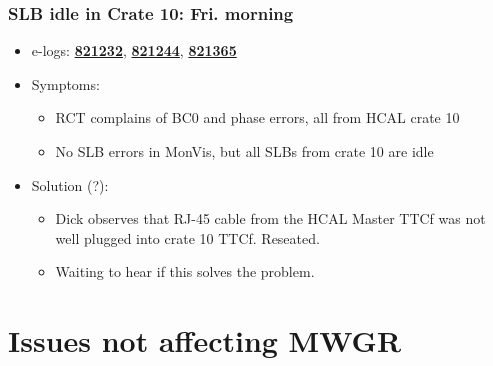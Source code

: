 \documentclass[bigger]{beamer}
\providecommand{\alert}[1]{\textbf{#1}}
\begin{document}
\begin{frame}
\frametitle{SLB idle in Crate 10: Fri. morning}
\label{sec-2-1-4}
\begin{itemize}

\item e-logs: \href{http://cmsonline.cern.ch/cms-elog/821232}{\alert{821232}}, \href{http://cmsonline.cern.ch/cms-elog/821244}{\alert{821244}}, \href{http://cmsonline.cern.ch/cms-elog/821365}{\alert{821365}}
\label{sec-2-1-4-1}%

\item Symptoms:
\label{sec-2-1-4-2}%
\begin{itemize}

\item RCT complains of BC0 and phase errors, all from HCAL crate 10
\label{sec-2-1-4-2-1}%

\item No SLB errors in MonVis, but all SLBs from crate 10 are idle
\label{sec-2-1-4-2-2}%
\end{itemize} %

\item Solution (?):
\label{sec-2-1-4-3}%
\begin{itemize}

\item Dick observes that RJ-45 cable from the HCAL Master TTCf was not well plugged into crate 10 TTCf.  Reseated.
\label{sec-2-1-4-3-1}%

\item Waiting to hear if this solves the problem.
\label{sec-2-1-4-3-2}%
\end{itemize} %
\end{itemize} %
\end{frame}
\section{Issues not affecting MWGR}
\label{sec-3}
\end{document}
